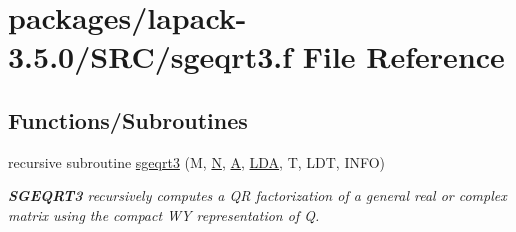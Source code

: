 \hypertarget{sgeqrt3_8f}{}\section{packages/lapack-\/3.5.0/\+S\+R\+C/sgeqrt3.f File Reference}
\label{sgeqrt3_8f}
\subsection*{Functions/\+Subroutines}
\begin{DoxyCompactItemize}
\item 
recursive subroutine \hyperlink{group__realGEcomputational_ga0ac033e696d80b5aa9e5289e47e3e7f9}{sgeqrt3} (M, \hyperlink{polmisc_8c_a0240ac851181b84ac374872dc5434ee4}{N}, \hyperlink{classA}{A}, \hyperlink{example__user_8c_ae946da542ce0db94dced19b2ecefd1aa}{L\+D\+A}, T, L\+D\+T, I\+N\+F\+O)
\begin{DoxyCompactList}\small\item\em {\bfseries S\+G\+E\+Q\+R\+T3} recursively computes a Q\+R factorization of a general real or complex matrix using the compact W\+Y representation of Q. \end{DoxyCompactList}\end{DoxyCompactItemize}
